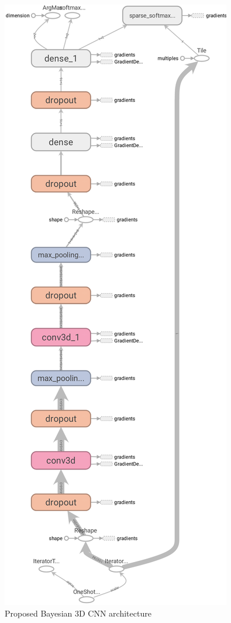 \documentclass[preprint,12pt]{elsarticle}
\begin{document}
\begin{figure}
	\centering
	\includegraphics[scale=.6]{images/cnnArch}
	\caption{Proposed Bayesian 3D CNN architecture}
	\label{fig:cnnArch}
\end{figure}
\end{document}
